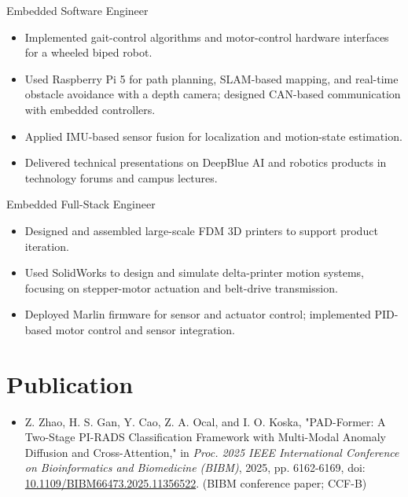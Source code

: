 \documentclass[9pt,letterpaper]{article}
\newcommand{\entry}[1]{\vspace{1.6pt}{\bfseries #1}\vspace{0.3pt}}
\begin{document}
\entry{DeepBlue Technology (Shanghai) | Apr 2024 - Jun 2025}
Embedded Software Engineer\\
\begin{itemize}
\item Implemented gait-control algorithms and motor-control hardware interfaces for a wheeled biped robot.
\item Used Raspberry Pi 5 for path planning, SLAM-based mapping, and real-time obstacle avoidance with a depth camera; designed CAN-based communication with embedded controllers.
\item Applied IMU-based sensor fusion for localization and motion-state estimation.
\item Delivered technical presentations on DeepBlue AI and robotics products in technology forums and campus lectures.
\end{itemize}
\entry{Sanyi 3D Technology (Qingdao) | Jan 2024 - Mar 2024}
Embedded Full-Stack Engineer\\
\begin{itemize}
\item Designed and assembled large-scale FDM 3D printers to support product iteration.
\item Used SolidWorks to design and simulate delta-printer motion systems, focusing on stepper-motor actuation and belt-drive transmission.
\item Deployed Marlin firmware for sensor and actuator control; implemented PID-based motor control and sensor integration.
\end{itemize}
\section*{Publication}
\begin{itemize}
\item Z. Zhao, H. S. Gan, Y. Cao, Z. A. Ocal, and I. O. Koska, "PAD-Former: A Two-Stage PI-RADS Classification Framework with Multi-Modal Anomaly Diffusion and Cross-Attention," in \textit{Proc. 2025 IEEE International Conference on Bioinformatics and Biomedicine (BIBM)}, 2025, pp. 6162-6169, doi: \href{https://doi.org/10.1109/BIBM66473.2025.11356522}{10.1109/BIBM66473.2025.11356522}. (BIBM conference paper; CCF-B)
\end{itemize}
\end{document}
